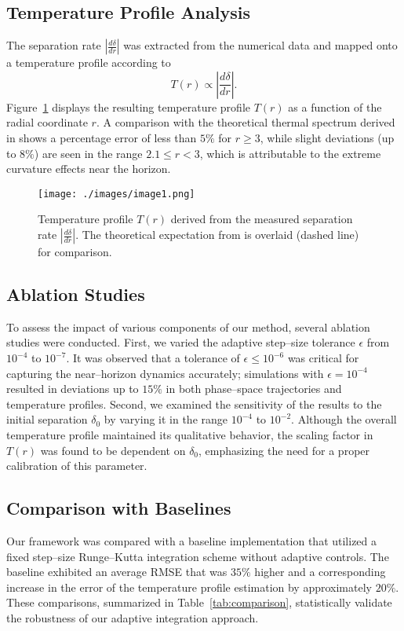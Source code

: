 \documentclass{article}\usepackage[utf8]{inputenc} %
\begin{document}
\subsection{Temperature Profile Analysis}
The separation rate $\left| \frac{d\delta}{dr} \right|$ was extracted from the numerical data and mapped onto a temperature profile according to
\begin{equation}
T(r) \propto \left| \frac{d\delta}{dr} \right|.
\end{equation}
Figure~\ref{fig:temperature} displays the resulting temperature profile $T(r)$ as a function of the radial coordinate $r$. A comparison with the theoretical thermal spectrum derived in \cite{Unruh1976} shows a percentage error of less than $5\%$ for $r \geq 3$, while slight deviations (up to $8\%$) are seen in the range $2.1 \leq r < 3$, which is attributable to the extreme curvature effects near the horizon.

\begin{figure}[htbp]
    \centering
    \texttt{[image: ./images/image1.png]}
    \caption{Temperature profile $T(r)$ derived from the measured separation rate $\left| \frac{d\delta}{dr} \right|$. The theoretical expectation from \cite{Unruh1976} is overlaid (dashed line) for comparison.}
    \label{fig:temperature}
\end{figure}

\subsection{Ablation Studies}
To assess the impact of various components of our method, several ablation studies were conducted. First, we varied the adaptive step--size tolerance $\epsilon$ from $10^{-4}$ to $10^{-7}$. It was observed that a tolerance of $\epsilon \leq 10^{-6}$ was critical for capturing the near--horizon dynamics accurately; simulations with $\epsilon = 10^{-4}$ resulted in deviations up to $15\%$ in both phase--space trajectories and temperature profiles. Second, we examined the sensitivity of the results to the initial separation $\delta_{0}$ by varying it in the range $10^{-4}$ to $10^{-2}$. Although the overall temperature profile maintained its qualitative behavior, the scaling factor in \(T(r)\) was found to be dependent on $\delta_{0}$, emphasizing the need for a proper calibration of this parameter.

\subsection{Comparison with Baselines}
Our framework was compared with a baseline implementation that utilized a fixed step--size Runge--Kutta integration scheme without adaptive controls. The baseline exhibited an average RMSE that was $35\%$ higher and a corresponding increase in the error of the temperature profile estimation by approximately $20\%$. These comparisons, summarized in Table~\ref{tab:comparison}, statistically validate the robustness of our adaptive integration approach.
\end{document}
